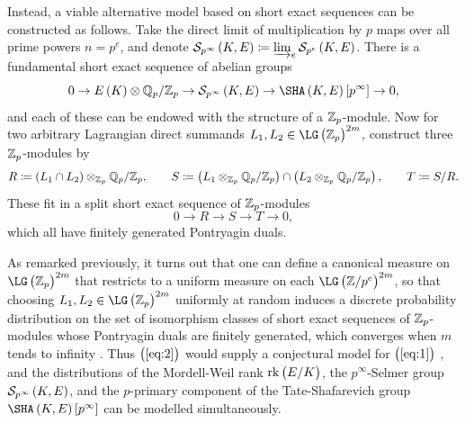 Instead, a viable alternative model based on short exact sequences can be constructed as follows. Take the direct limit of multiplication by $ p $ maps over all prime powers $ n = p^e $, and denote $ \Sel[p^\infty] \coloneqq \varinjlim_e \Sel[p^e] $. There is a fundamental short exact sequence of abelian groups
\begin{equation}
\label{eq:1}
0 \to E\br{K} \otimes \QQ_p / \ZZ_p \to \Sel[p^\infty] \to \Sha\sbr{p^\infty} \to 0,
\end{equation}
and each of these can be endowed with the structure of a $ \mathbb{Z}_p $-module. Now for two arbitrary Lagrangian direct summands $ L_1, L_2 \in \LG\br{\ZZ_p}^{2m} $, construct three $ \mathbb{Z}_p $-modules by
$$ R \coloneqq \br{L_1 \cap L_2} \otimes_{\ZZ_p} \QQ_p / \ZZ_p, \qquad S \coloneqq \br{L_1 \otimes_{\ZZ_p} \QQ_p / \ZZ_p} \cap \br{L_2 \otimes_{\ZZ_p} \QQ_p / \ZZ_p}, \qquad T \coloneqq S / R. $$
These fit in a split short exact sequence of $ \mathbb{Z}_p $-modules \cite[Corollary 5.3]{BKLPR15}
\begin{equation}
\label{eq:2}
0 \to R \to S \to T \to 0,
\end{equation}
which all have finitely generated Pontryagin duals.

\pagebreak

As remarked previously, it turns out that one can define a canonical measure on $ \LG\br{\ZZ_p}^{2m} $ that restricts to a uniform measure on each $ \LG\br{\ZZ / p^e}^{2m} $, so that choosing $ L_1, L_2 \in \LG\br{\ZZ_p}^{2m} $ uniformly at random induces a discrete probability distribution on the set of isomorphism classes of short exact sequences of $ \mathbb{Z}_p $-modules whose Pontryagin duals are finitely generated, which converges when $ m $ tends to infinity \cite[Theorem 1.2]{BKLPR15}. Thus $ \br{\ref{eq:2}} $ would supply a conjectural model for $ \br{\ref{eq:1}} $ \cite[Conjecture 1.3]{BKLPR15}, and the distributions of the Mordell-Weil rank $ \rkE $, the $ p^\infty $-Selmer group $ \Sel[p^\infty] $, and the $ p $-primary component of the Tate-Shafarevich group $ \Sha\sbr{p^\infty} $ can be modelled simultaneously.

